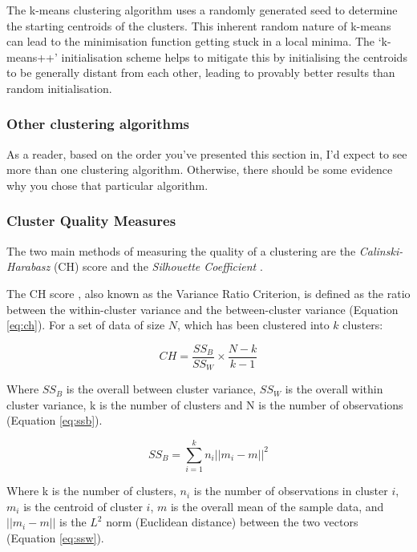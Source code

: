 The k-means clustering algorithm uses a randomly generated seed to determine the starting centroids of the clusters. This inherent random nature of k-means can lead to the minimisation function getting stuck in a local minima. The `k-means++' initialisation scheme helps to mitigate this by initialising the centroids to be generally distant from each other, leading to provably better results than random initialisation. 

\subsubsection{Other clustering algorithms}

As a reader, based on the order you've presented this section in, I'd expect to see more than one clustering algorithm. Otherwise, there should be some evidence why you chose that particular algorithm.

\subsubsection{Cluster Quality Measures}
The two main methods of measuring the quality of a clustering are the \textit{Calinski-Harabasz} (CH) score and the \textit{Silhouette Coefficient} \cite{cluster-measures}.

The CH score \cite{ch-score}, also known as the Variance Ratio Criterion, is defined as the ratio between the within-cluster variance and the between-cluster variance (Equation \ref{eq:ch}). For a set of data of size $N$, which has been clustered into $k$ clusters:

\begin{equation}
    CH = \frac{SS_B}{SS_W}\times\frac{N-k}{k-1}
    \label{eq:ch}
\end{equation}
 
Where $SS_B$ is the overall between cluster variance, $SS_W$ is the overall within cluster variance, k is the number of clusters and N is the number of observations (Equation \ref{eq:ssb}). 

\begin{equation}
    SS_B = \sum_{i=1}^kn_i\vert\vert m_i - m\vert\vert ^2
    \label{eq:ssb}
\end{equation}

Where k is the number of clusters, $n_i$ is the number of observations in cluster $i$, $m_i$ is the centroid of cluster $i$, $m$ is the overall mean of the sample data, and $||m_i - m||$ is the $L^2$ norm (Euclidean distance) between the two vectors (Equation \ref{eq:ssw}).

